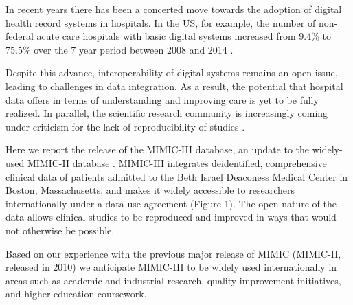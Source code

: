 \documentclass[english]{article}
\begin{document}

In recent years there has been a concerted move towards the adoption of digital health record systems in hospitals. In the US, for example, the number of non-federal acute care hospitals with basic digital systems increased from 9.4\% to 75.5\% over the 7 year period between 2008 and 2014 \cite{cite1}.

Despite this advance, interoperability of digital systems remains an open issue, leading to challenges in data integration. As a result, the potential that hospital data offers in terms of understanding and improving care is yet to be fully realized. In parallel, the scientific research community is increasingly coming under criticism for the lack of reproducibility of studies \cite{cite2}.

Here we report the release of the MIMIC-III database, an update to the widely-used MIMIC-II database \cite{cite3,mimic-iii}. MIMIC-III integrates deidentified, comprehensive clinical data of patients admitted to the Beth Israel Deaconess Medical Center in Boston, Massachusetts, and makes it widely accessible to researchers internationally under a data use agreement (Figure 1). The open nature of the data allows clinical studies to be reproduced and improved in ways that would not otherwise be possible.

Based on our experience with the previous major release of MIMIC (MIMIC-II, released in 2010) we anticipate MIMIC-III to be widely used internationally in areas such as academic and industrial research, quality improvement initiatives, and higher education coursework. 
\end{document}
